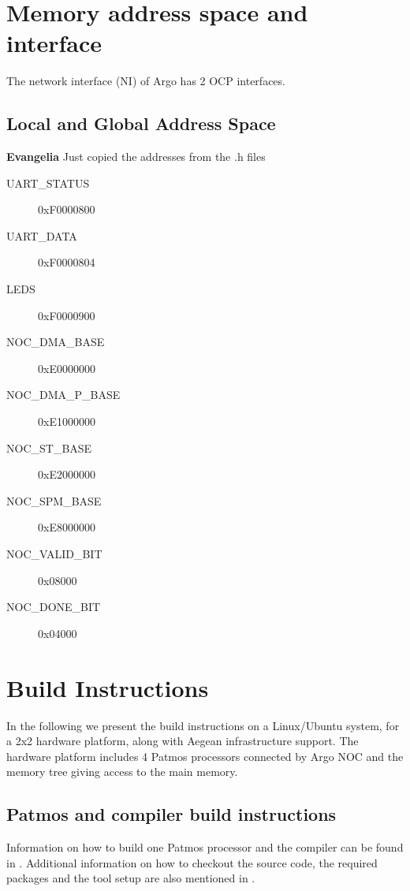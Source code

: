 \documentclass[a4paper,fontsize=10pt,twoside,DIV15,BCOR12mm,headinclude=true,footinclude=false,pagesize,bibtotoc]{scrbook}
\newcommand{\comment}[3]{

\textsf{\textbf{#1}} {\color{#3}#2}}
\newcommand{\eva}[1]{\comment{Evangelia}{#1}{Green}}
\begin{document}
\chapter{Memory address space and interface}
\label{chap:mem}
The network interface (NI) of Argo has 2 OCP\cite{ocp:spec} interfaces.


\section{Local and Global Address Space}

\eva{Just copied the addresses from the .h files}
\begin{description}
\item[UART\_STATUS]      0xF0000800
\item[UART\_DATA]        0xF0000804
\item[LEDS]              0xF0000900
\item[NOC\_DMA\_BASE]    0xE0000000
\item[NOC\_DMA\_P\_BASE] 0xE1000000
\item[NOC\_ST\_BASE]     0xE2000000
\item[NOC\_SPM\_BASE]    0xE8000000
\item[NOC\_VALID\_BIT]   0x08000
\item[NOC\_DONE\_BIT]    0x04000
\end{description}


\chapter{Build Instructions}

In the following we present the build instructions on a Linux/Ubuntu system,
for a 2x2 hardware platform, along with Aegean infrastructure support.
The hardware platform includes 4 Patmos processors connected by Argo NOC
and the memory tree giving access to the main memory.


\section{Patmos and compiler build instructions}

Information on how to build one Patmos processor and the compiler can be found in \cite{patmos-handbook}.
Additional information on how to checkout the source code, the required packages and the tool setup
are also mentioned in \cite{patmos-handbook}.
\end{document}
